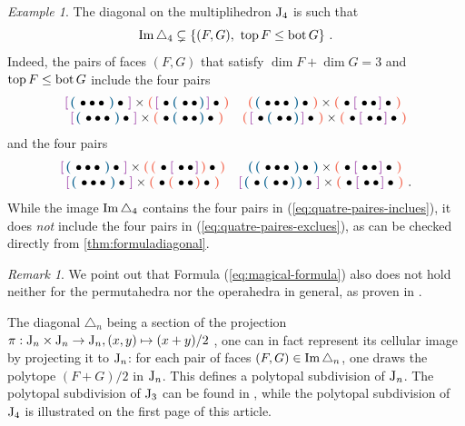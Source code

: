 \documentclass[10pt]{amsart}
\theoremstyle{remark}
\newtheorem{example}[definition]{\sc Example}
\newtheorem{remark}[definition]{\sc Remark}
\begin{document}
\begin{example} \label{prop:pas-top-bot}
The diagonal on the multiplihedron $\mathrm{J}_4$ is such that
\[ \operatorname{Im} \triangle_4 \subsetneq \{ (F,G) , \ \operatorname{top} F\leq \operatorname{bot} G \} \ . \]
Indeed, the pairs of faces $(F,G)$ that satisfy $\dim F + \dim G = 3$ and $\operatorname{top} F\leq \operatorname{bot} G$ include the four pairs 
\begin{equation} \label{eq:quatre-paires-inclues}
\begin{matrix}
\purple{\blue{\bullet \bullet \bullet}\bullet} \times \red{\purple{\bullet\blue{\bullet\bullet}}\bullet} & 
\red{\blue{\bullet\bullet\bullet}\bullet} \times \red{\bullet\purple{\bullet\bullet}\bullet}  \\
\purple{\blue{\bullet\bullet\bullet}\bullet} \times \red{\bullet\blue{\bullet\bullet}\bullet} &
\red{\purple{\bullet\blue{\bullet\bullet}}\bullet} \times \red{\bullet\purple{\bullet\bullet}\bullet}  
\end{matrix}
\end{equation}
and the four pairs
\begin{equation} \label{eq:quatre-paires-exclues}
\begin{matrix}
\purple{\blue{\bullet \bullet \bullet}\bullet} \times \red{\red{\bullet\purple{\bullet\bullet}}\bullet} & 
\blue{\blue{\bullet\bullet\bullet}\bullet} \times \red{\bullet\purple{\bullet\bullet}\bullet}  \\
\purple{\blue{\bullet\bullet\bullet}\bullet} \times \red{\bullet\red{\bullet\bullet}\bullet} &
\purple{\blue{\bullet\blue{\bullet\bullet}}\bullet} \times \red{\bullet\purple{\bullet\bullet}\bullet}  \ .
\end{matrix}
\end{equation}
While the image $\operatorname{Im} \triangle_4$ contains the four pairs in (\ref{eq:quatre-paires-inclues}), it does \emph{not} include the four pairs in (\ref{eq:quatre-paires-exclues}), as can be checked directly from \cref{thm:formuladiagonal}.
\end{example}

\begin{remark}
We point out that Formula (\ref{eq:magical-formula}) also does not hold neither for the permutahedra nor the operahedra in general, as proven in \cite[Section 3.2]{LA21}. 
\end{remark}

The diagonal $\triangle_n$ being a section of the projection $\pi : \mathrm{J}_n \times \mathrm{J}_n \to \mathrm{J}_n , (x,y) \mapsto (x+y)/2$ \cite[Proposition 1.1]{LA21}, one can in fact represent its cellular image by projecting it to $\mathrm{J}_n$: for each pair of faces $(F,G) \in \operatorname{Im} \triangle_n$, one draws the polytope $(F+G)/2$ in $\mathrm{J}_n$. This defines a polytopal subdivision of $\mathrm{J}_n$. The polytopal subdivision of $\mathrm{J}_3$ can be found in \cite[Figure 3]{LA21}, while the polytopal subdivision of $\mathrm{J}_4$ is illustrated on the first page of this article.
\end{document}
